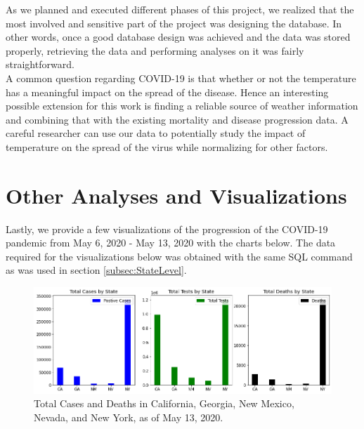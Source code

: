 \documentclass[11pt]{article}
\begin{document}
\noindent
As we planned and executed different phases of this project, we realized that the most involved and sensitive part of the project was designing the database. In other words, once a good database design was achieved and the data was stored properly, retrieving the data and performing analyses on it was fairly straightforward.\\

\noindent
 A common question regarding COVID-19 is that whether or not the temperature has a meaningful impact on the spread of the disease. Hence an interesting possible extension for this work is finding a reliable source of weather information and combining that with the existing mortality and disease progression data. A careful researcher can use our data to potentially study the impact of temperature on the spread of the virus while normalizing for other factors.

\pagebreak




\pagebreak

\appendix

\section{Other Analyses and Visualizations}

\noindent
Lastly, we provide a few visualizations of the progression of the COVID-19 pandemic from May 6, 2020 - May 13, 2020 with the charts below. The data required for the visualizations below was obtained with the same SQL command as was used in section \ref{subsec:StateLevel}.

\FloatBarrier
\begin{figure}[h]
    \centering
    \includegraphics[width=\linewidth]{diagrams/analysis/total_cases_bar.png}
    \caption{Total Cases and Deaths in California, Georgia, New Mexico, Nevada, and New York, as of May 13, 2020.}
    \label{fig:overall}
\end{figure}
\FloatBarrier
\end{document}
